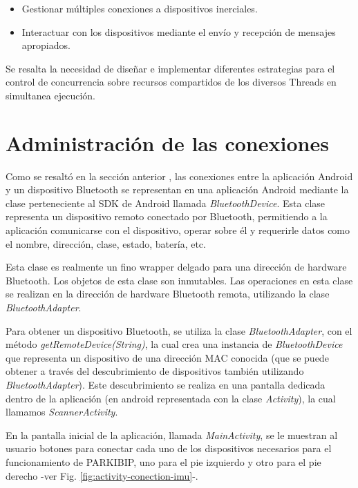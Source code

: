 \begin{itemize}
    \item Gestionar múltiples conexiones a dispositivos inerciales.
    \item Interactuar con los dispositivos mediante el envío y recepción de mensajes apropiados.
\end{itemize}

Se resalta la necesidad de diseñar e implementar diferentes estrategias para el control de concurrencia sobre recursos compartidos de los diversos Threads en simultanea ejecución.

\section{Administración de las conexiones}

Como se resaltó en la sección anterior , las conexiones entre la aplicación Android y un dispositivo Bluetooth se representan en una aplicación Android mediante la clase perteneciente al SDK de Android llamada \textit{BluetoothDevice}. Esta clase representa un dispositivo remoto conectado por Bluetooth, permitiendo a la aplicación comunicarse con el dispositivo, operar sobre él y requerirle datos como el nombre, dirección, clase, estado, batería, etc. 

Esta clase es realmente un fino \gls{wrapper} delgado para una dirección de hardware Bluetooth. Los objetos de esta clase son inmutables. Las operaciones en esta clase se realizan en la dirección de hardware Bluetooth remota, utilizando la clase \textit{BluetoothAdapter}. 

Para obtener un dispositivo Bluetooth, se utiliza la clase \textit{BluetoothAdapter}, con el método \textit{getRemoteDevice(String)}, la cual crea una instancia de \textit{BluetoothDevice} que representa un dispositivo de una dirección MAC conocida (que se puede obtener a través del descubrimiento de dispositivos también utilizando \textit{BluetoothAdapter}). Este descubrimiento se realiza en una pantalla dedicada dentro de la aplicación (en android representada con la clase \textit{Activity}), la cual llamamos \textit{ScannerActivity}. 

En la pantalla inicial de la aplicación, llamada \textit{MainActivity}, se le muestran al usuario botones para conectar cada uno de los dispositivos necesarios para el funcionamiento de PARKIBIP, uno para el pie izquierdo y otro para el pie derecho -ver Fig. \ref{fig:activity-conection-imu}-. 

